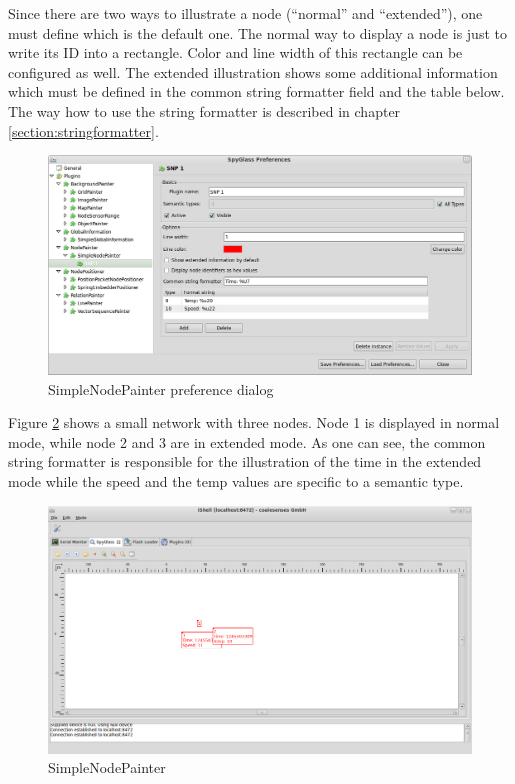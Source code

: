 Since there are two ways to illustrate a node (``normal'' and ``extended''), one must define which is the default one.
The normal way to display a node is just to write its ID into a rectangle. Color and line width of this rectangle can be configured
as well. The extended illustration shows some additional information which must be defined in the common string formatter
field and the table below. The way how to use the string formatter is described in chapter \ref{section:stringformatter}.

\begin{figure}[htb]
  \begin{center}
    \includegraphics[width=13.2cm]{./pics/simplenodepainter_prefpage}
    \caption{SimpleNodePainter preference dialog}
    \label{pic:snp_preferences}
  \end{center}
\end{figure}

Figure \ref{pic:snp} shows a small network with three nodes. Node 1 is displayed in normal mode, while node 2 and 3 are
in extended mode. As one can see, the common string formatter is responsible for the illustration of the time in the
extended mode while the speed and the temp values are specific to a semantic type.

\begin{figure}[htb]
  \begin{center}
    \includegraphics[width=13.2cm]{./pics/simplenodepainter}
    \caption{SimpleNodePainter}
    \label{pic:snp}
  \end{center}
\end{figure}

